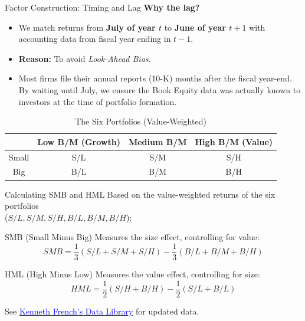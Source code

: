 \documentclass{beamer}
\begin{document}
\begin{frame}{Factor Construction: Timing and Lag}
	\textbf{Why the lag?}
	\begin{itemize}
		\item We match returns from \textbf{July of year $t$} to \textbf{June of year $t+1$} with accounting data from fiscal year ending in \textbf{$t-1$}.
		\item \textbf{Reason:} To avoid \textit{Look-Ahead Bias}.
		\item Most firms file their annual reports (10-K) months after the fiscal year-end. By waiting until July, we ensure the Book Equity data was actually known to investors at the time of portfolio formation.
	\end{itemize}
	
	\begin{table}[h]
		\centering
		\caption{The Six Portfolios (Value-Weighted)}
		\begin{tabular}{c|ccc}
			\hline
			& Low B/M (Growth) & Medium B/M & High B/M (Value) \\
			\hline
			Small & S/L & S/M & S/H \\
			Big   & B/L & B/M & B/H \\
			\hline
		\end{tabular}
	\end{table}
\end{frame}

\begin{frame}{Calculating SMB and HML}
	Based on the value-weighted returns of the six portfolios\\ ($S/L, S/M, S/H, B/L, B/M, B/H$):
	
	\begin{block}{SMB (Small Minus Big)}
		Measures the size effect, controlling for value:
		$$ SMB = \frac{1}{3}(S/L + S/M + S/H) - \frac{1}{3}(B/L + B/M + B/H) $$
	\end{block}
	
	\begin{block}{HML (High Minus Low)}
		Measures the value effect, controlling for size:
		$$ HML = \frac{1}{2}(S/H + B/H) - \frac{1}{2}(S/L + B/L) $$
	\end{block}
	
	\footnotesize
	See \href{https://mba.tuck.dartmouth.edu/pages/faculty/ken.french/data_library.html}{\textcolor{blue}{Kenneth French's Data Library}} for updated data.
\end{frame}
\end{document}
